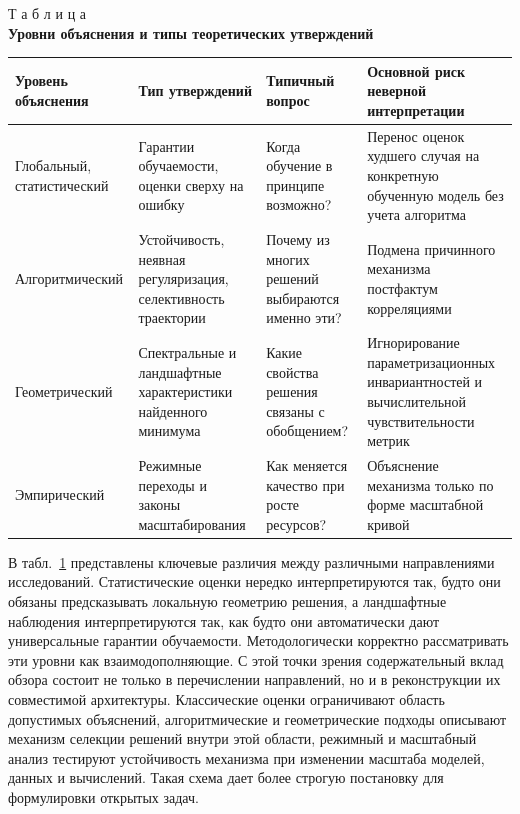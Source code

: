 \begin{table}[htbp]
\label{tab:ch0sv_explanation_levels}
\begin{flushright}
{Т а б л и ц а \thetable}\\
\centering
\textbf{Уровни объяснения и типы теоретических утверждений}
\end{flushright}
\centering
\scriptsize
\setlength{\tabcolsep}{3pt}
\begin{tabular}{|>{\raggedright\arraybackslash}m{1.05in}|>{\raggedright\arraybackslash}m{1.15in}|>{\raggedright\arraybackslash}m{1.25in}|>{\raggedright\arraybackslash}m{1.55in}|}
\hline
Уровень объяснения & Тип утверждений & Типичный вопрос & Основной риск неверной интерпретации \\
\hline
Глобальный, статистический & Гарантии обучаемости, оценки сверху на ошибку & Когда обучение в принципе возможно? & Перенос оценок худшего случая на конкретную обученную модель без учета алгоритма \\
\hline
Алгоритмический & Устойчивость, неявная регуляризация, селективность траектории & Почему из многих решений выбираются именно эти? & Подмена причинного механизма постфактум корреляциями \\
\hline
Геометрический & Спектральные и ландшафтные характеристики найденного минимума & Какие свойства решения связаны с обобщением? & Игнорирование параметризационных инвариантностей и вычислительной чувствительности метрик \\
\hline
Эмпирический & Режимные переходы и законы масштабирования & Как меняется качество при росте ресурсов? & Объяснение механизма только по форме масштабной кривой \\
\hline
\end{tabular}
\end{table}

В табл.~\ref{tab:ch0sv_explanation_levels} представлены ключевые различия между различными направлениями исследований.
Статистические оценки нередко интерпретируются так, будто они обязаны предсказывать локальную геометрию решения, а ландшафтные наблюдения интерпретируются так, как будто они автоматически дают универсальные гарантии обучаемости.
Методологически корректно рассматривать эти уровни как взаимодополняющие.
С этой точки зрения содержательный вклад обзора состоит не только в перечислении направлений, но и в реконструкции их совместимой архитектуры.
Классические оценки ограничивают область допустимых объяснений, алгоритмические и геометрические подходы описывают механизм селекции решений внутри этой области, режимный и масштабный анализ тестируют устойчивость механизма при изменении масштаба моделей, данных и вычислений.
Такая схема дает более строгую постановку для формулировки открытых задач.

